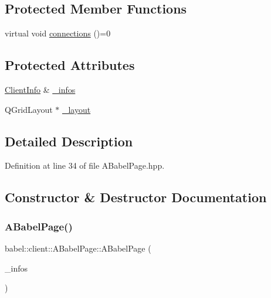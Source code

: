 \subsection*{Protected Member Functions}
\begin{DoxyCompactItemize}
\item 
virtual void \mbox{\hyperlink{classbabel_1_1client_1_1_a_babel_page_a37097dfd8ded982074554509e5eab8b0}{connections}} ()=0
\end{DoxyCompactItemize}
\subsection*{Protected Attributes}
\begin{DoxyCompactItemize}
\item 
\mbox{\hyperlink{classbabel_1_1client_1_1_client_info}{Client\+Info}} \& \mbox{\hyperlink{classbabel_1_1client_1_1_a_babel_page_aa2070ebfda878ceff938b8a60e7e2898}{\+\_\+infos}}
\item 
Q\+Grid\+Layout $\ast$ \mbox{\hyperlink{classbabel_1_1client_1_1_a_babel_page_a9c304f2168515a54c393a38c89d4e2aa}{\+\_\+layout}}
\end{DoxyCompactItemize}


\subsection{Detailed Description}


Definition at line 34 of file A\+Babel\+Page.\+hpp.



\subsection{Constructor \& Destructor Documentation}
\mbox{\label{classbabel_1_1client_1_1_a_babel_page_ac21e8b8f232917da3385ba41fc3ee493}} 
\subsubsection{\texorpdfstring{A\+Babel\+Page()}{ABabelPage()}}
{\footnotesize\ttfamily babel\+::client\+::\+A\+Babel\+Page\+::\+A\+Babel\+Page (\begin{DoxyParamCaption}\item[{\mbox{\hyperlink{classbabel_1_1client_1_1_client_info}{Client\+Info}} \&}]{\+\_\+infos }\end{DoxyParamCaption})}



